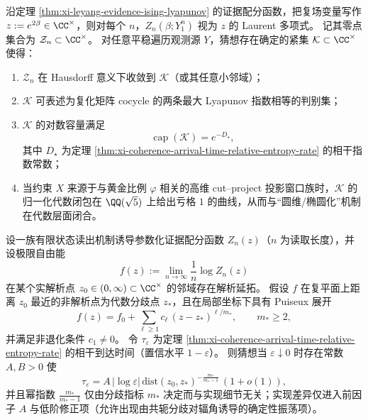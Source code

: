 \begin{conjecture}\label{conj:xi-leyang-boundary-capacity-coherence}
沿定理 \ref{thm:xi-leyang-evidence-ising-lyapunov} 的证据配分函数，把复场变量写作 \(z:=e^{2\beta}\in\CC^\times\)，则对每个 \(n\)，\(Z_n(\beta;Y_1^n)\) 视为 \(z\) 的 Laurent 多项式。
记其零点集合为 \(\mathcal Z_n\subset\CC^\times\)。
对任意平稳遍历观测源 \(Y\)，猜想存在确定的紧集 \(\mathcal K\subset\CC^\times\) 使得：
\begin{enumerate}
  \item \(\mathcal Z_n\) 在 Hausdorff 意义下收敛到 \(\mathcal K\)（或其任意小邻域）；
  \item \(\mathcal K\) 可表述为复化矩阵 cocycle 的两条最大 Lyapunov 指数相等的判别集；
  \item \(\mathcal K\) 的对数容量满足
  \[
  \operatorname{cap}(\mathcal K)=e^{-D_\star},
  \]
  其中 \(D_\star\) 为定理 \ref{thm:xi-coherence-arrival-time-relative-entropy-rate} 的相干指数常数；
  \item 当约束 \(X\) 来源于与黄金比例 \(\varphi\) 相关的高维 cut--project 投影窗口族时，\(\mathcal K\) 的归一化代数闭包在 \(\QQ(\sqrt5)\) 上给出亏格 \(1\) 的曲线，从而与“圆维/椭圆化”机制在代数层面闭合。
\end{enumerate}
\end{conjecture}

\begin{conjecture}\label{conj:xi-leyang-puiseux-index-coherence-time}
设一族有限状态读出机制诱导参数化证据配分函数 \(Z_n(z)\)（\(n\) 为读取长度），并设极限自由能
\[
f(z):=\lim_{n\to\infty}\frac1n\log Z_n(z)
\]
在某个实解析点 \(z_0\in(0,\infty)\subset\CC^\times\) 的邻域存在解析延拓。
假设 \(f\) 在复平面上距离 \(z_0\) 最近的非解析点为代数分歧点 \(z_\ast\)，且在局部坐标下具有 Puiseux 展开
\[
f(z)=f_0+\sum_{\ell\ge 1}c_\ell\,(z-z_\ast)^{\ell/m_\ast},
\qquad
m_\ast\ge 2,
\]
并满足非退化条件 \(c_1\neq 0\)。
令 \(\tau_\varepsilon\) 为定理 \ref{thm:xi-coherence-arrival-time-relative-entropy-rate} 的相干到达时间（置信水平 \(1-\varepsilon\)）。
则猜想当 \(\varepsilon\downarrow 0\) 时存在常数 \(A,B>0\) 使
\[
\tau_\varepsilon
=
A\,|\log\varepsilon|\,\mathrm{dist}(z_0,z_\ast)^{-\frac{m_\ast}{m_\ast-1}}\,(1+o(1)),
\]
并且幂指数 \(\frac{m_\ast}{m_\ast-1}\) 仅由分歧指标 \(m_\ast\) 决定而与实现细节无关；实现差异仅进入前因子 \(A\) 与低阶修正项（允许出现由共轭分歧对辐角诱导的确定性振荡项）。
\end{conjecture}


